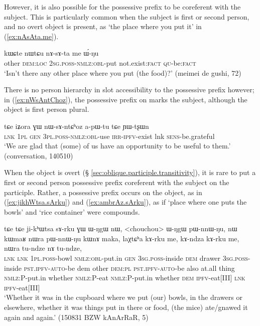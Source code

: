 However, it is also possible for the possessive prefix to be coreferent with the subject. This is particularly common when the subject is first or second person, and no overt object is present, as  `the place where you put it' in (\ref{ex:nAsAta.me}).
 
 \begin{exe}
\ex \label{ex:nAsAta.me}
\gll   kɯɕte nɯtɕu nɤ-sɤ-ta me ɯ́-ŋu \\
other \textsc{dem}:\textsc{loc} \textsc{2sg}.\textsc{poss}-\textsc{nmlz}:\textsc{obl}-put not.exist:\textsc{fact} \textsc{qu}-be:\textsc{fact} \\
\glt `Isn't there any other place where you put (the food)?' (meimei de gushi, 72)
 \end{exe} 

There is no person hierarchy in slot accessibility to the possessive prefix however; in (\ref{ex:nWsAntChoz}), the possessive prefix on  marks the subject, although the object is first person plural. 

 \begin{exe}
\ex \label{ex:nWsAntChoz}
\gll  tɕe iʑora ɣɯ nɯ-sɤ-ntɕʰoz a-pɯ-tu tɕe ɲɯ-tʂɯn \\
\textsc{lnk} \textsc{1pl} \textsc{gen} \textsc{3pl}.\textsc{poss}-\textsc{nmlz}:\textsc{obl}-use \textsc{irr}-\textsc{ipfv}-exist lnk \textsc{sens}-be.grateful \\
\glt `We are glad that (some) of us have an opportunity to be useful to them.' (conversation, 140510)
 \end{exe}
   
When the object is overt (§ \ref{sec:oblique.participle.transitivity}), it is rare to put a first or second person possessive prefix coreferent with the subject on the participle. Rather, a possessive prefix occurs on the object, as in (\ref{ex:jikhWtsa.sArku}) and (\ref{ex:ambrAz.sArku}), as if  `place where one puts the bowls' and  `rice container' were compounds.

\begin{exe}
\ex \label{ex:jikhWtsa.sArku}
\gll    tɕe tɕe ji-kʰɯtsa sɤ-rku ɣɯ ɯ-ŋgɯ nɯ, <chouchou> ɯ-ŋgɯ pɯ-nnɯ-ŋu, nɯ kɯmaʁ nɯra pɯ-nnɯ-ŋu kɯnɤ maka, laχtɕʰa kɤ-rku me, kɤ-ndza kɤ-rku me, nɯra tu-ndze nɤ tu-ndze, \\
\textsc{lnk} \textsc{lnk} \textsc{1pl}.\textsc{poss}-bowl \textsc{nmlz}:\textsc{obl}-put.in \textsc{gen} \textsc{3sg}.\textsc{poss}-inside \textsc{dem} drawer \textsc{3sg}.\textsc{poss}-inside \textsc{pst}.\textsc{ipfv}-\textsc{auto}-be dem other \textsc{dem}:\textsc{pl} \textsc{pst}.\textsc{ipfv}-\textsc{auto}-be  also at.all thing \textsc{nmlz}:P-put.in whether \textsc{nmlz}:P-eat \textsc{nmlz}:P-put.in whether \textsc{dem} \textsc{ipfv}-eat[III] \textsc{lnk}  \textsc{ipfv}-eat[III] \\
\glt `Whether it was in the cupboard where we put (our) bowls, in the drawers or elsewhere, whether it was things put in there or food, (the mice) ate/gnawed it again and again.' (150831 BZW kAnArRaR, 5)
\end{exe} 

